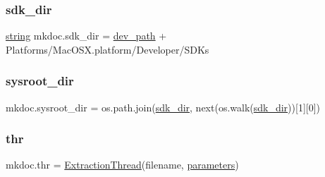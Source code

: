 \subsubsection{\texorpdfstring{sdk\_dir}{sdk\_dir}}
{\footnotesize\ttfamily \mbox{\hyperlink{asdl_8h_ae84541b4f3d8e1ea24ec0f466a8c568b}{string}} mkdoc.\+sdk\+\_\+dir = \mbox{\hyperlink{namespacemkdoc_afd27915357cd6df92f7e64673bd208b5}{dev\+\_\+path}} + \textquotesingle{}Platforms/Mac\+O\+S\+X.\+platform/Developer/S\+D\+Ks\textquotesingle{}}

\mbox{\label{namespacemkdoc_a1e126f52ce0b98ad1c7967e6a4034ece}} 
\subsubsection{\texorpdfstring{sysroot\_dir}{sysroot\_dir}}
{\footnotesize\ttfamily mkdoc.\+sysroot\+\_\+dir = os.\+path.\+join(\mbox{\hyperlink{namespacemkdoc_a812adec5149aaa5538af4bd942c1f480}{sdk\+\_\+dir}}, next(os.\+walk(\mbox{\hyperlink{namespacemkdoc_a812adec5149aaa5538af4bd942c1f480}{sdk\+\_\+dir}}))\mbox{[}1\mbox{]}\mbox{[}0\mbox{]})}

\mbox{\label{namespacemkdoc_ab136f9c1bffd08b25a73887b8f6c1c91}} 
\subsubsection{\texorpdfstring{thr}{thr}}
{\footnotesize\ttfamily mkdoc.\+thr = \mbox{\hyperlink{classmkdoc_1_1_extraction_thread}{Extraction\+Thread}}(filename, \mbox{\hyperlink{namespacemkdoc_a2cff62850018cb669b1d13bb8c335018}{parameters}})}

